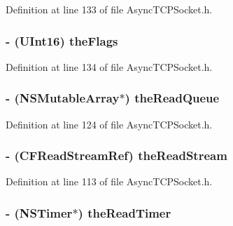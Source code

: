 Definition at line 133 of file AsyncTCPSocket.h.

\hypertarget{interface_async_t_c_p_socket_a0870b15c6ba4a8fbd05122ef3994c40e}{
\subsubsection[{theFlags}]{\setlength{\rightskip}{0pt plus 5cm}-\/ (UInt16) {\bf theFlags}}}
\label{interface_async_t_c_p_socket_a0870b15c6ba4a8fbd05122ef3994c40e}


Definition at line 134 of file AsyncTCPSocket.h.

\hypertarget{interface_async_t_c_p_socket_a85c9e429b90f304a6ce8b91913332447}{
\subsubsection[{theReadQueue}]{\setlength{\rightskip}{0pt plus 5cm}-\/ (NSMutableArray$\ast$) {\bf theReadQueue}}}
\label{interface_async_t_c_p_socket_a85c9e429b90f304a6ce8b91913332447}


Definition at line 124 of file AsyncTCPSocket.h.

\hypertarget{interface_async_t_c_p_socket_ad218c2f4f2900c520d97818aff0365c1}{
\subsubsection[{theReadStream}]{\setlength{\rightskip}{0pt plus 5cm}-\/ (CFReadStreamRef) {\bf theReadStream}}}
\label{interface_async_t_c_p_socket_ad218c2f4f2900c520d97818aff0365c1}


Definition at line 113 of file AsyncTCPSocket.h.

\hypertarget{interface_async_t_c_p_socket_aea6adb1bfaf69917a47a7dcdc65863e0}{
\subsubsection[{theReadTimer}]{\setlength{\rightskip}{0pt plus 5cm}-\/ (NSTimer$\ast$) {\bf theReadTimer}}}
\label{interface_async_t_c_p_socket_aea6adb1bfaf69917a47a7dcdc65863e0}



